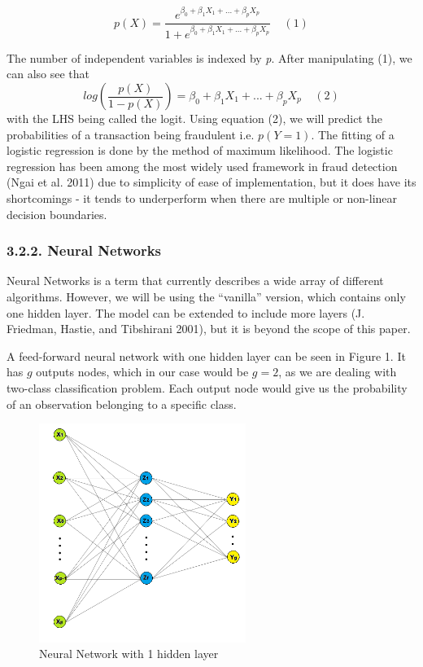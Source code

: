 \documentclass[12pt,]{article}
\begin{document}
\[p(X) = \frac{e^{\beta_0 + \beta_1X_1 + ... + \beta_pX_p}}{1 + e^{\beta_0 + \beta_1X_1 + ... + \beta_pX_p}}\;\;\;\;(1)\]

The number of independent variables is indexed by \emph{p}. After
manipulating (1), we can also see that
\[log(\frac{p(X)}{1-p(X)})=\beta_0+ \beta_1X_1 + ... + \beta_pX_p\;\;\;\;(2)\]
with the LHS being called the logit. Using equation (2), we will predict
the probabilities of a transaction being fraudulent i.e. \(p(Y = 1)\).
The fitting of a logistic regression is done by the method of maximum
likelihood. The logistic regression has been among the most widely used
framework in fraud detection (Ngai et al. 2011) due to simplicity of
ease of implementation, but it does have its shortcomings - it tends to
underperform when there are multiple or non-linear decision boundaries.

\hypertarget{neural-networks}{%
\subsubsection{3.2.2. Neural Networks}\label{neural-networks}}

Neural Networks is a term that currently describes a wide array of
different algorithms. However, we will be using the ``vanilla'' version,
which contains only one hidden layer. The model can be extended to
include more layers (J. Friedman, Hastie, and Tibshirani 2001), but it
is beyond the scope of this paper.

A feed-forward neural network with one hidden layer can be seen in
Figure 1. It has \(g\) outputs nodes, which in our case would be
\(g=2\), as we are dealing with two-class classification problem. Each
output node would give us the probability of an observation belonging to
a specific class.

\begin{figure}
\centering
\includegraphics[width=0.6\textwidth,height=\textheight]{figures/nnet.png}
\caption{Neural Network with 1 hidden layer}
\end{figure}
\end{document}
